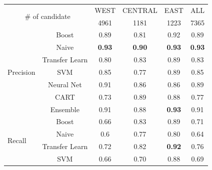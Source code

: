 \documentclass[conference]{IEEEtran}
\begin{document}
\begin{figure}[t]
\centering
\begin{adjustbox}{max width=\textwidth}
\begin{tabular}{|l|c|c|c|c|c|}
\hline
\multicolumn{2}{|c|}{\multirow{2}{*}{\# of candidate}}            & WEST          & CENTRAL       & EAST          & ALL           \\
\multicolumn{2}{|c|}{}                                            & 4961          & 1181          & 1223          & 7365          \\ \hline
\multicolumn{1}{|c|}{\multirow{7}{*}{Precision}} & Boost          & 0.89          & 0.81          & 0.92          & 0.89          \\ \cline{2-6} 
\multicolumn{1}{|c|}{}                           & Naive          & \textbf{0.93} & \textbf{0.90} & \textbf{0.93} & \textbf{0.93} \\ \cline{2-6} 
\multicolumn{1}{|c|}{}                           & Transfer Learn & 0.80          & 0.83          & 0.89          & 0.83          \\ \cline{2-6} 
\multicolumn{1}{|c|}{}                           & SVM            & 0.85          & 0.77          & 0.89          & 0.85          \\ \cline{2-6} 
\multicolumn{1}{|c|}{}                           & Neural Net     & 0.91          & 0.86          & 0.86          & 0.89          \\ \cline{2-6} 
\multicolumn{1}{|c|}{}                           & CART           & 0.73          & 0.89          & 0.88          & 0.77          \\ \cline{2-6} 
\multicolumn{1}{|c|}{}                           & Ensemble       & 0.91          & 0.88          & \textbf{0.93} & 0.91          \\ \hline
\multirow{7}{*}{Recall}                          & Boost          & 0.66          & 0.83          & 0.89          & 0.71          \\ \cline{2-6} 
                                                 & Naive          & 0.6           & 0.77          & 0.80          & 0.64          \\ \cline{2-6} 
                                                 & Transfer Learn & 0.72          & 0.82          & \textbf{0.92} & 0.76          \\ \cline{2-6} 
                                                 & SVM            & 0.66          & 0.70          & 0.88          & 0.69          \\ \cline{2-6} 

\end{tabular}
\end{adjustbox}
\end{figure}
\end{document}
